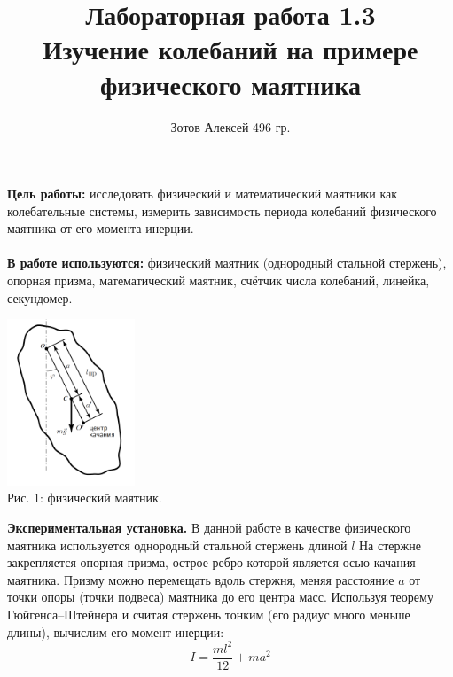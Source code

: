 \documentclass[12pt]{article}
\begin{document}
    \author {Зотов Алексей 496 гр.}
    \title {Лабораторная работа 1.3 \\  Изучение колебаний на примере физического маятника}
    \maketitle{}   

    \indent
    \textbf{Цель работы:} исследовать физический и математический маятники
    как колебательные системы, измерить зависимость периода колебаний физического маятника от его момента инерции.
    \\ \\
    \indent
    \textbf{В работе используются:} физический маятник (однородный стальной стержень), опорная призма, математический маятник, счётчик числа колебаний, линейка, секундомер.

    \begin{center} 
        \includegraphics[width=1.5in]{phys_mtn.png} \\ Рис. 1: физический маятник.
    \end{center}
    

    \textbf{Экспериментальная установка.}
    В данной работе в качестве физического маятника используется однородный стальной стержень длиной
    $l$  На стержне закрепляется опорная призма, острое ребро
    которой является осью качания маятника. Призму можно перемещать
    вдоль стержня, меняя расстояние $a$ от точки опоры (точки подвеса)
    маятника до его центра масс. Используя теорему Гюйгенса–Штейнера 
    и считая стержень тонким (его радиус много
    меньше длины), вычислим его момент инерции:
    \begin{equation}
        I = \frac{ml^2}{12} + ma^2
    \end{equation}
\end{document}

